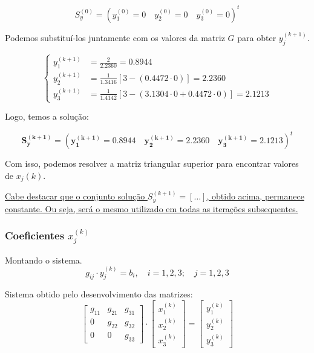 \documentclass[12pt,a4paper]{article}
\begin{document}
\[
S_y^{(0)} = \left( y_1^{(0)} = 0 \quad y_2^{(0)} = 0 \quad y_3^{(0)} = 0 \right)^{t}
\]

\noindent
Podemos substituí-los juntamente com os valores da matriz \( G \) para obter \( y_j^{(k + 1)} \).

\[
\left\{
\begin{aligned}
y_1^{(k + 1)} &= \frac{2}{2.2360} = 0.8944 \\
y_2^{(k + 1)} &= \frac{1}{1.3416} \left[ 3 - \left(0.4472 \cdot 0\right) \right] = 2.2360 \\
y_3^{(k + 1)} &= \frac{1}{1.4142} \left[ 3 - \left(3.1304 \cdot 0 + 0.4472 \cdot 0\right) \right] = 2.1213
\end{aligned}
\right.
\]

Logo, temos a solução:

\[
\boldsymbol{S_y^{(k + 1)}} = \left( \boldsymbol{y_1^{(k + 1)}} = \mathbf{0.8944} \quad \boldsymbol{y_2^{(k + 1)}} = \mathbf{2.2360} \quad \boldsymbol{y_3^{(k + 1)}} = \mathbf{2.1213} \right)^{t}
\]

Com isso, podemos resolver a matriz triangular superior para encontrar valores de \( x_j(k) \).

\vspace{0.3cm}

\uline{Cabe destacar que o conjunto solução \( S_y^{(k + 1)} = [\ldots] \), obtido acima, permanece constante. Ou seja, será o mesmo utilizado em todas as iterações subsequentes.}

\subsubsection{Coeficientes \(x_j^{(k)}\)}

Montando o sistema.
\[
g_{ij} \cdot y_j^{(k)} = b_i, \quad i = 1, 2, 3; \quad j = 1, 2, 3
\]

Sistema obtido pelo desenvolvimento das matrizes:
\[
\begin{bmatrix}
g_{11} & g_{21} & g_{31} \\
0 & g_{22} & g_{32} \\
0 & 0 & g_{33}
\end{bmatrix}
\cdot
\begin{bmatrix}
x_1^{(k)} \\
x_2^{(k)} \\
x_3^{(k)}
\end{bmatrix}
=
\begin{bmatrix}
y_1^{(k)} \\
y_2^{(k)} \\
y_3^{(k)}
\end{bmatrix}
\]
\end{document}
